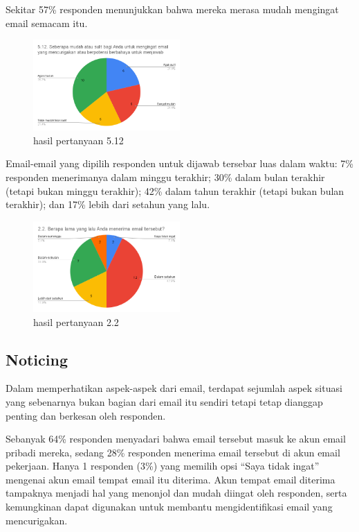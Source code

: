 \documentclass[lettersize,journal]{IEEEtran}
\begin{document}
Sekitar 57\% responden menunjukkan bahwa mereka merasa mudah mengingat email
semacam itu.

\begin{figure}[h!]
  \centering
  \includegraphics[width=0.5\textwidth]{image/5.12.png}
  \caption{hasil pertanyaan 5.12}
  \label{fig:pertanyaan_5.12}
\end{figure}

Email-email yang dipilih responden untuk dijawab tersebar luas dalam waktu: 7\%
responden menerimanya dalam minggu terakhir; 30\% dalam bulan terakhir (tetapi
bukan minggu terakhir); 42\% dalam tahun terakhir (tetapi bukan bulan
terakhir); dan 17\% lebih dari setahun yang lalu.

\begin{figure}[h!]
  \centering
  \includegraphics[width=0.5\textwidth]{image/2.2.png}
  \caption{hasil pertanyaan 2.2}
  \label{fig:pertanyaan_2.2}
\end{figure}



\subsection{Noticing}

Dalam memperhatikan aspek-aspek dari email, terdapat sejumlah aspek situasi 
yang sebenarnya bukan bagian dari email itu sendiri tetapi tetap dianggap penting dan berkesan oleh responden.

Sebanyak 64\% responden menyadari bahwa email tersebut masuk ke akun email
pribadi mereka, sedang 28\% responden menerima email tersebut di akun email pekerjaan. 
Hanya 1 responden (3\%) yang memilih opsi “Saya tidak ingat”
mengenai akun email tempat email itu diterima. Akun tempat email diterima 
tampaknya menjadi hal yang menonjol dan mudah diingat oleh responden, serta
kemungkinan dapat digunakan untuk membantu mengidentifikasi email yang mencurigakan. 
\end{document}
